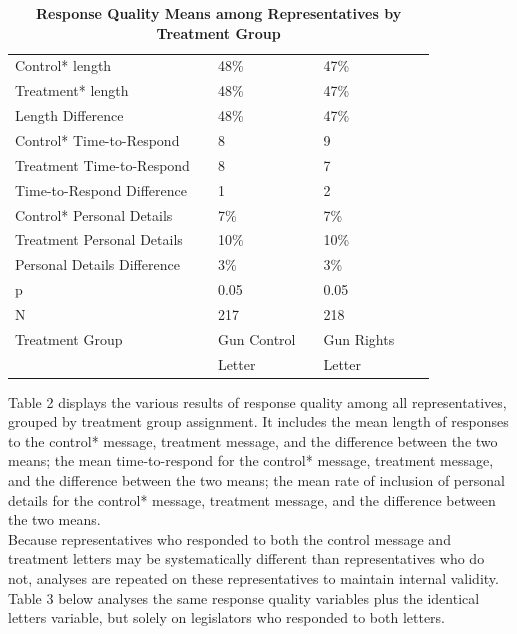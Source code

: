 \documentclass[12pt]{article}\usepackage[]{graphicx}\usepackage[]{color}
\begin{document}
 \begin{table}[h!]
	\caption{\textbf{Response Quality Means among Representatives by Treatment Group}}
	\label{tab2}
	\begin{tabular}{lllllll}
		Control* length   && 48\%            &&   47\%\\
		Treatment* length   && 48\%            &&   47\%\\
		Length Difference   && 48\%            &&   47\%\\
		\hline
		Control* Time-to-Respond   && 8            &&   9\\
		Treatment Time-to-Respond && 8          &&   7\\ 
		Time-to-Respond Difference && 1            &&   2\\
		\hline 
		Control* Personal Details                && 7\%            &&   7\% \\
		Treatment Personal Details                && 10\%            &&   10\%\\
		Personal Details Difference && 3\%                      && 3\%\\
		\hline
		p            && 0.05 				&&   0.05 \\
		N 			 &&      217 			 &&  218    \\
		\hline
		Treatment Group && Gun Control  && Gun Rights & \\
		&&	Letter		&& Letter
	\end{tabular}
\end{table}

Table 2 displays the various results of response quality among all representatives, grouped by treatment group assignment. It includes the mean length of responses to the control* message, treatment message, and the difference between the two means; the mean time-to-respond for the control* message, treatment message, and the difference between the two means; the mean rate of inclusion of personal details for the control* message, treatment message, and the difference between the two means.\\
Because representatives who responded to both the control message and treatment letters may be systematically different than representatives who do not, analyses are repeated on these representatives to maintain internal validity. Table 3 below analyses the same response quality variables plus the identical letters variable, but solely on legislators who responded to both letters.
\end{document}
